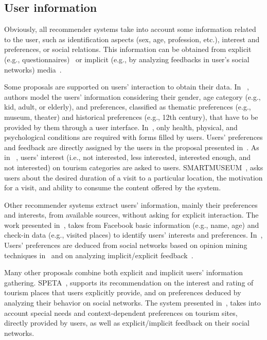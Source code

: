 \subsection{User information}
Obviously, all recommender systems take into account some information related to the user, such as identification aspects (sex, age, profession, etc.), interest and preferences, or social relations. This information can be obtained from explicit (e.g., questionnaires)~\cite{jannach2020interactive} or implicit (e.g., by analyzing feedbacks in user's social networks) media~\cite{lin2018hybrid}.  

Some proposals are supported on users' interaction to obtain their data. In  %
~\cite{rajaonarivo2019rec}, authors model the users' information considering their gender, age category (e.g., kid, adult, or elderly), and preferences, classified as thematic preferences (e.g., museum, theater) and historical preferences (e.g., 12th century), that have to be provided by them through a user interface.  In~\cite{santos2019using}, only health,  physical, and psychological conditions are required  with forms filled by users. 
Users' preferences and feedback are directly assigned by the users in the proposal presented in~\cite{bahramian_abbaspour_claramunt_2017}. As in ~\cite{arigi2018context}, users' interest (i.e., not interested, less interested, interested enough, and not interested) on tourism categories are asked to users. SMARTMUSEUM~\cite{ruotsalo2013smartmuseum}, asks users about the desired duration of a visit to a particular location, the motivation for a visit, and ability to consume the content offered by the system.
 

Other recommender systems extract users' information, mainly their preferences and interests, from available sources,
without asking for explicit interaction.  The work presented in~\cite{kesorn2017personalized}, takes from Facebook basic information (e.g., name, age) and  check-in data (e.g., visited places)  to identify users' interests and preferences.  In~\cite{logesh2019exploring,logesh2018personalised}, 
Users' preferences are deduced from social networks based on opinion mining techniques in~\cite{logesh2019exploring,logesh2018personalised} and on analyzing implicit/explicit feedback~\cite{hidasi2016general}. 


Many other proposals combine both explicit and implicit users' information gathering. SPETA~\cite{garcia2009speta},  supports  its recommendation on the interest and rating  of tourism places that users explicitly provide, and on preferences deduced by analyzing their behavior on social networks. The system presented in~\cite{alonso2012ontology}, takes into account special needs and  context-dependent preferences on tourism sites, directly  provided by users, as well as explicit/implicit feedback on their social networks. 

